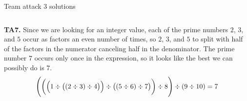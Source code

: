 \documentclass[9pt,aspectratio=169,handout]{beamer}
\begin{document}
\begin{frame}{Team attack 3 solutions}
\begin{columns}[T]
\begin{column}{0.5\textwidth}
      \textbf{TA7.} Since we are looking for an integer value, each of the prime numbers $2$, $3$, and $5$ occur as factors an even
      number of times, so $2$, $3$, and $5$ to split with half of the
      factors in the numerator canceling half in the denominator. The prime number $7$ occurs only once in the
      expression, so it looks like the best we can
      possibly do is $7$.
      \[ \Biggl(\biggl(\Bigl(1 \div \bigl(\left( 2 \div 3\right) \div 4\bigr)\Bigr) \div \bigl(\left(5 \div 6\right) \div 7\bigr)\biggr) \div 8 \Biggr) \div \left(9 \div 10\right) = 7\]
    \end{column}
  \end{columns}
\end{frame}




\end{document}
